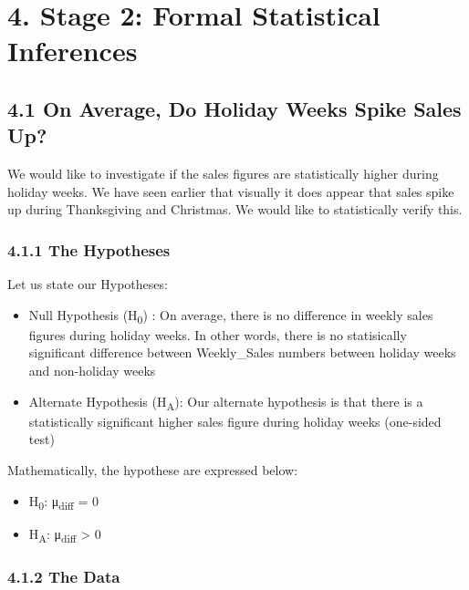 \documentclass[]{article}
\begin{document}
\pagebreak

\section{4. Stage 2: Formal Statistical
Inferences}\label{stage-2-formal-statistical-inferences}

\subsection{4.1 On Average, Do Holiday Weeks Spike Sales
Up?}\label{on-average-do-holiday-weeks-spike-sales-up}

We would like to investigate if the sales figures are statistically
higher during holiday weeks. We have seen earlier that visually it does
appear that sales spike up during Thanksgiving and Christmas. We would
like to statistically verify this.

\subsubsection{4.1.1 The Hypotheses}\label{the-hypotheses}

Let us state our Hypotheses:

\begin{itemize}
\itemsep1pt\parskip0pt
\item
  Null Hypothesis (H\textsubscript{0}) : On average, there is no
  difference in weekly sales figures during holiday weeks. In other
  words, there is no statisically significant difference between
  Weekly\_Sales numbers between holiday weeks and non-holiday weeks
\item
  Alternate Hypothesis (H\textsubscript{A}): Our alternate hypothesis is
  that there is a statistically significant higher sales figure during
  holiday weeks (one-sided test)
\end{itemize}

Mathematically, the hypothese are expressed below:

\begin{itemize}
\itemsep1pt\parskip0pt
\item
  H\textsubscript{0}: μ\textsubscript{diff} = 0
\item
  H\textsubscript{A}: μ\textsubscript{diff} \textgreater{} 0
\end{itemize}

\subsubsection{4.1.2 The Data}\label{the-data}
\end{document}
